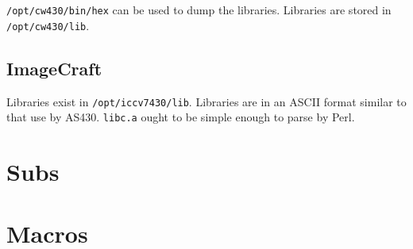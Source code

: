 \documentclass[]{book}
\begin{document}
{\tt /opt/cw430/bin/hex} can be used to dump the libraries.
Libraries are stored in {\tt /opt/cw430/lib}.

\section{ImageCraft}


Libraries exist in {\tt /opt/iccv7430/lib}.  Libraries are in an ASCII format
similar to that use by AS430.  {\tt libc.a} ought to be simple enough to parse
by Perl.

\appendix

\chapter{Subs}
%

\chapter{Macros}
%

\printindex
\end{document}
